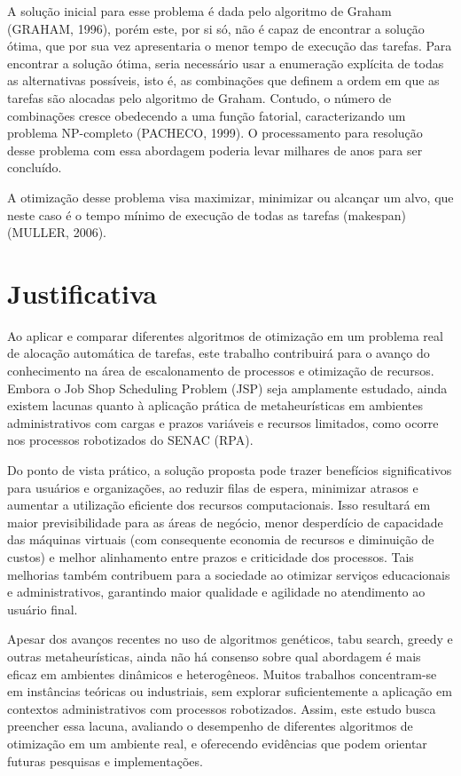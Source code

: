 \documentclass[
    12pt,                %
    openright,           %
    oneside,             %
    a4paper,             %
    english,             %
    brazil               %
]{abntex2}
\begin{document}
A solução inicial para esse problema é dada pelo algoritmo de Graham (GRAHAM, 1996), porém este, por si só, não é capaz de encontrar a solução ótima, que por sua vez apresentaria o menor tempo de execução das tarefas. Para encontrar a solução ótima, seria necessário usar a enumeração explícita de todas as alternativas possíveis, isto é, as combinações que definem a ordem em que as tarefas são alocadas pelo algoritmo de Graham. Contudo, o número de combinações cresce obedecendo a uma função fatorial, caracterizando um problema NP-completo (PACHECO, 1999). O processamento para resolução desse problema com essa abordagem poderia levar milhares de anos para ser concluído.

A otimização desse problema visa maximizar, minimizar ou alcançar um alvo, que neste caso é o tempo mínimo de execução de todas as tarefas (makespan) (MULLER, 2006).

\section{Justificativa}
\label{sec:justificativa}

Ao aplicar e comparar diferentes algoritmos de otimização em um problema real de alocação automática de tarefas, este trabalho contribuirá para o avanço do conhecimento na área de escalonamento de processos e otimização de recursos. Embora o Job Shop Scheduling Problem (JSP) seja amplamente estudado, ainda existem lacunas quanto à aplicação prática de metaheurísticas em ambientes administrativos com cargas e prazos variáveis e recursos limitados, como ocorre nos processos robotizados do SENAC (RPA).

Do ponto de vista prático, a solução proposta pode trazer benefícios significativos para usuários e organizações, ao reduzir filas de espera, minimizar atrasos e aumentar a utilização eficiente dos recursos computacionais. Isso resultará em maior previsibilidade para as áreas de negócio, menor desperdício de capacidade das máquinas virtuais (com consequente economia de recursos e diminuição de custos) e melhor alinhamento entre prazos e criticidade dos processos. Tais melhorias também contribuem para a sociedade ao otimizar serviços educacionais e administrativos, garantindo maior qualidade e agilidade no atendimento ao usuário final.

Apesar dos avanços recentes no uso de algoritmos genéticos, tabu search, greedy e outras metaheurísticas, ainda não há consenso sobre qual abordagem é mais eficaz em ambientes dinâmicos e heterogêneos. Muitos trabalhos concentram-se em instâncias teóricas ou industriais, sem explorar suficientemente a aplicação em contextos administrativos com processos robotizados. Assim, este estudo busca preencher essa lacuna, avaliando o desempenho de diferentes algoritmos de otimização em um ambiente real, e oferecendo evidências que podem orientar futuras pesquisas e implementações.
\end{document}
